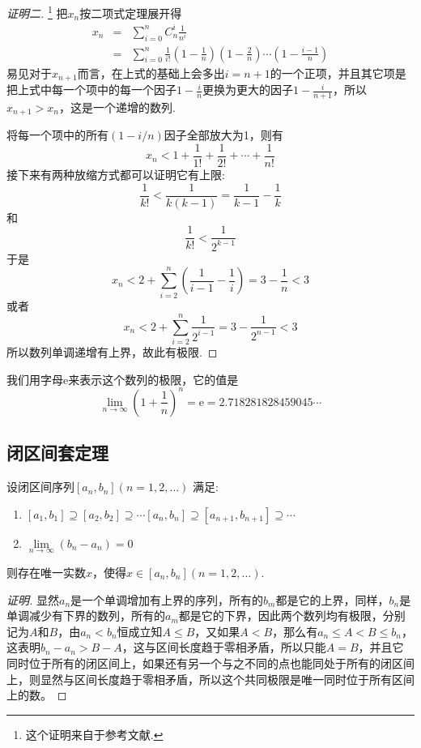\begin{proof}[证明二]\footnote{这个证明来自于参考文献\cite{math-analysis}.}
  把$x_n$按二项式定理展开得
  \begin{eqnarray*}
    x_n & = & \sum_{i=0}^n C_n^i \frac{1}{n^i} \\
    & = & \sum_{i=0}^n \frac{1}{i!}\left( 1-\frac{1}{n} \right) \left( 1-\frac{2}{n} \right)\cdots \left( 1-\frac{i-1}{n} \right)
  \end{eqnarray*}
  易见对于$x_{n+1}$而言，在上式的基础上会多出$i=n+1$的一个正项，并且其它项是把上式中每一个项中的每一个因子$1-\frac{i}{n}$更换为更大的因子$1-\frac{i}{n+1}$，所以$x_{n+1}>x_n$，这是一个递增的数列.

  将每一个项中的所有$(1-i/n)$因子全部放大为1，则有
  \[  x_n < 1+\frac{1}{1!}+\frac{1}{2!}+\cdots+\frac{1}{n!} \]
  接下来有两种放缩方式都可以证明它有上限:
  \[ \frac{1}{k!} < \frac{1}{k(k-1)} = \frac{1}{k-1} - \frac{1}{k} \]
  和
  \[ \frac{1}{k!} < \frac{1}{2^{k-1}} \]
  于是
  \[ x_n < 2 + \sum_{i=2}^n \left( \frac{1}{i-1}-\frac{1}{i} \right) = 3-\frac{1}{n} < 3 \]
  或者
  \[ x_n < 2 + \sum_{i=2}^n \frac{1}{2^{i-1}} = 3-\frac{1}{2^{n-1}} < 3 \]
  所以数列单调递增有上界，故此有极限.
\end{proof}

我们用字母$\mathrm{e}$来表示这个数列的极限，它的值是
\[ \lim_{n \to \infty} \left( 1+\frac{1}{n} \right)^n = \mathrm{e}= 2.718281828459045\cdots \]

\subsection{闭区间套定理}
\label{sec:theorem-of-closed-interval-sequence}

\begin{theorem}[闭区间套定理]
  \label{closed-interval-sequence-theorem}
  设闭区间序列$[a_n,b_n](n=1,2,\ldots)$ 满足:
  \begin{enumerate}
  \item $[a_1,b_1] \supseteq [a_2,b_2] \supseteq \cdots [a_n,b_n] \supseteq [a_{n+1},b_{n+1}] \supseteq \cdots$
  \item $\lim\limits_{n \to \infty} (b_n-a_n) = 0$
  \end{enumerate}
    则存在唯一实数$x$，使得$x \in [a_n,b_n](n=1,2,\ldots)$.
\end{theorem}

\begin{proof}[证明]
  显然$a_n$是一个单调增加有上界的序列，所有的$b_m$都是它的上界，同样，$b_n$是单调减少有下界的数列，所有的$a_m$都是它的下界，因此两个数列均有极限，分别记为$A$和$B$，由$a_n < b_n$恒成立知$A \leqslant B$，又如果$A<B$，那么有$a_n\leqslant A < B \leqslant b_n$，这表明$b_n-a_n>B-A$，这与区间长度趋于零相矛盾，所以只能$A=B$，并且它同时位于所有的闭区间上，如果还有另一个与之不同的点也能同处于所有的闭区间上，则显然与区间长度趋于零相矛盾，所以这个共同极限是唯一同时位于所有区间上的数。
\end{proof}

